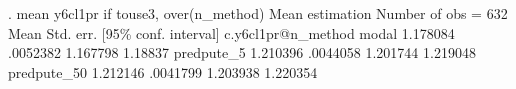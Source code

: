 . mean y6cl1pr if touse3, over(n_method)
{\smallskip}
Mean estimation                                  Number of obs = 632
{\smallskip}
                   {\VBAR}       Mean   Std. err.     [95\% conf. interval]
c.y6cl1pr@n_method {\VBAR}
            modal  {\VBAR}   1.178084   .0052382      1.167798     1.18837
       predpute_5  {\VBAR}   1.210396   .0044058      1.201744    1.219048
      predpute_50  {\VBAR}   1.212146   .0041799      1.203938    1.220354
